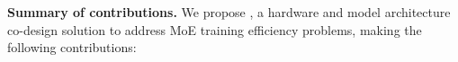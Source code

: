 











\textbf{Summary of contributions.} We propose \Algname, a hardware and model architecture co-design solution to address MoE training efficiency problems, making the following contributions:

